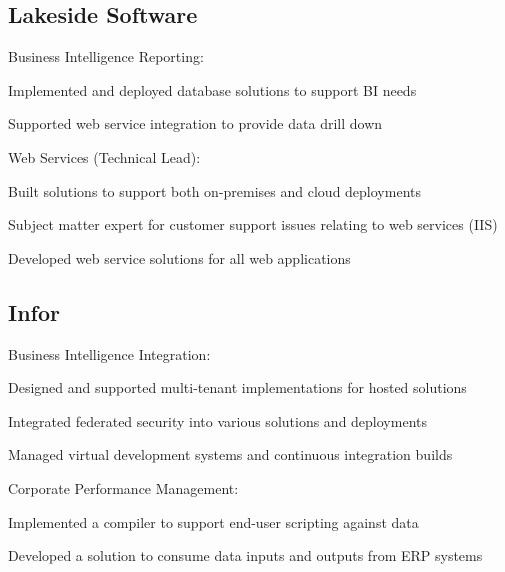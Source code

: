 \documentclass[]{formatting}
\begin{document}
\begin{minipage}[t]{0.66\textwidth}
\subsection{Lakeside Software}
\vspace{2pt}
Business Intelligence Reporting:
\begin{tightemize}
\item Implemented and deployed database solutions to support BI needs
\item Supported web service integration to provide data drill down
\end{tightemize}
Web Services (Technical Lead):
\begin{tightemize}
\item Built solutions to support both on-premises and cloud deployments
\item Subject matter expert for customer support issues relating to web services (IIS)
\item Developed web service solutions for all web applications
\end{tightemize}
\sectionsep

\subsection{Infor}
\vspace{2pt}
Business Intelligence Integration:
\\
\begin{tightemize}
\item Designed and supported multi-tenant implementations for hosted solutions
\item Integrated federated security into various solutions and deployments
\item Managed virtual development systems and continuous integration builds
\end{tightemize}
Corporate Performance Management:
\\
\begin{tightemize}
\item Implemented a compiler to support end-user scripting against data
\item Developed a solution to consume data inputs and outputs from ERP systems
\end{tightemize}
\vspace{5pt}


\end{minipage}
\end{document}
